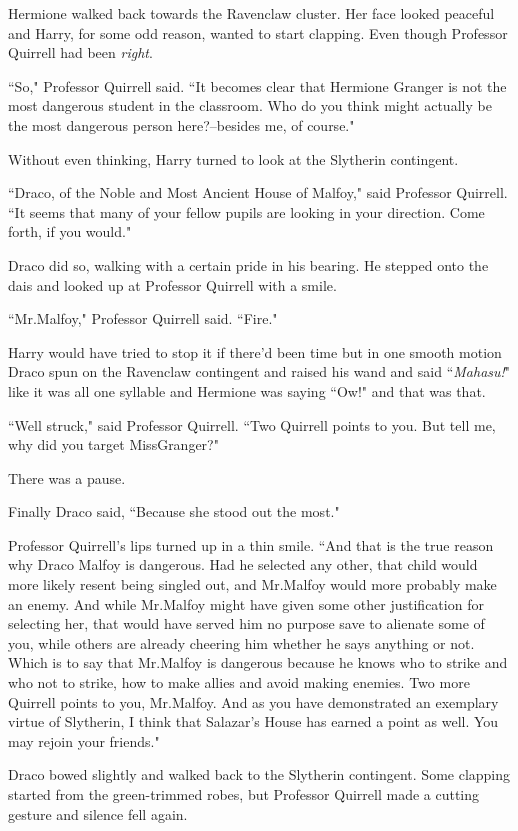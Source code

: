 Hermione walked back towards the Ravenclaw cluster. Her face looked peaceful and Harry, for some odd reason, wanted to start clapping. Even though Professor Quirrell had been \emph{right}.

``So," Professor Quirrell said. ``It becomes clear that Hermione Granger is not the most dangerous student in the classroom. Who do you think might actually be the most dangerous person here?\---besides me, of course."

Without even thinking, Harry turned to look at the Slytherin contingent.

``Draco, of the Noble and Most Ancient House of Malfoy," said Professor Quirrell. ``It seems that many of your fellow pupils are looking in your direction. Come forth, if you would."

Draco did so, walking with a certain pride in his bearing. He stepped onto the dais and looked up at Professor Quirrell with a smile.

``Mr.\?Malfoy," Professor Quirrell said. ``Fire."

Harry would have tried to stop it if there'd been time but in one smooth motion Draco spun on the Ravenclaw contingent and raised his wand and said ``\emph{Mahasu!}" like it was all one syllable and Hermione was saying ``Ow!" and that was that.

``Well struck," said Professor Quirrell. ``Two Quirrell points to you. But tell me, why did you target Miss\?Granger?"

There was a pause.

Finally Draco said, ``Because she stood out the most."

Professor Quirrell's lips turned up in a thin smile. ``And that is the true reason why Draco Malfoy is dangerous. Had he selected any other, that child would more likely resent being singled out, and Mr.\?Malfoy would more probably make an enemy. And while Mr.\?Malfoy might have given some other justification for selecting her, that would have served him no purpose save to alienate some of you, while others are already cheering him whether he says anything or not. Which is to say that Mr.\?Malfoy is dangerous because he knows who to strike and who not to strike, how to make allies and avoid making enemies. Two more Quirrell points to you, Mr.\?Malfoy. And as you have demonstrated an exemplary virtue of Slytherin, I think that Salazar's House has earned a point as well. You may rejoin your friends."

Draco bowed slightly and walked back to the Slytherin contingent. Some clapping started from the green-trimmed robes, but Professor Quirrell made a cutting gesture and silence fell again.

